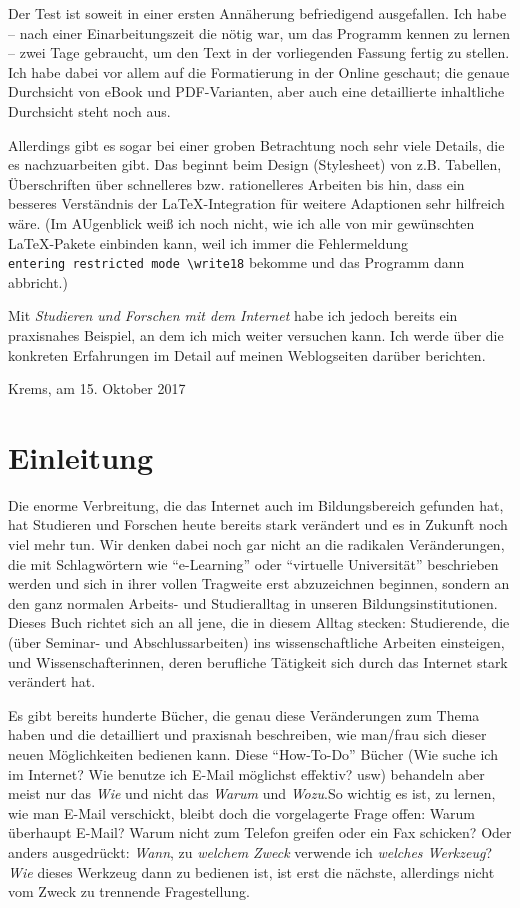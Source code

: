 \documentclass[]{book}
\theoremstyle{definition}
\theoremstyle{definition}
\theoremstyle{definition}
\theoremstyle{remark}
\begin{document}
Der Test ist soweit in einer ersten Annäherung befriedigend ausgefallen.
Ich habe -- nach einer Einarbeitungszeit die nötig war, um das Programm
kennen zu lernen -- zwei Tage gebraucht, um den Text in der vorliegenden
Fassung fertig zu stellen. Ich habe dabei vor allem auf die Formatierung
in der Online geschaut; die genaue Durchsicht von eBook und
PDF-Varianten, aber auch eine detaillierte inhaltliche Durchsicht steht
noch aus.

Allerdings gibt es sogar bei einer groben Betrachtung noch sehr viele
Details, die es nachzuarbeiten gibt. Das beginnt beim Design
(Stylesheet) von z.B. Tabellen, Überschriften über schnelleres bzw.
rationelleres Arbeiten bis hin, dass ein besseres Verständnis der
LaTeX-Integration für weitere Adaptionen sehr hilfreich wäre. (Im
AUgenblick weiß ich noch nicht, wie ich alle von mir gewünschten
LaTeX-Pakete einbinden kann, weil ich immer die Fehlermeldung
\texttt{entering\ restricted\ mode\ \textbackslash{}write18} bekomme und
das Programm dann abbricht.)

Mit \emph{Studieren und Forschen mit dem Internet} habe ich jedoch
bereits ein praxisnahes Beispiel, an dem ich mich weiter versuchen kann.
Ich werde über die konkreten Erfahrungen im Detail auf meinen
Weblogseiten darüber berichten.

Krems, am 15. Oktober 2017

\chapter*{Einleitung}\label{einleitung}

Die enorme Verbreitung, die das Internet auch im Bildungsbereich
gefunden hat, hat Studieren und Forschen heute bereits stark verändert
und es in Zukunft noch viel mehr tun. Wir denken dabei noch gar nicht an
die radikalen Veränderungen, die mit Schlagwörtern wie ``e-Learning''
oder ``virtuelle Universität'' beschrieben werden und sich in ihrer
vollen Tragweite erst abzuzeichnen beginnen, sondern an den ganz
normalen Arbeits- und Studieralltag in unseren Bildungsinstitutionen.
Dieses Buch richtet sich an all jene, die in diesem Alltag stecken:
Studierende, die (über Seminar- und Abschlussarbeiten) ins
wissenschaftliche Arbeiten einsteigen, und Wissenschafterinnen, deren
berufliche Tätigkeit sich durch das Internet stark verändert hat.

Es gibt bereits hunderte Bücher, die genau diese Veränderungen zum Thema
haben und die detailliert und praxisnah beschreiben, wie man/frau sich
dieser neuen Möglichkeiten bedienen kann. Diese ``How-To-Do'' Bücher
(Wie suche ich im Internet? Wie benutze ich E-Mail möglichst effektiv?
usw) behandeln aber meist nur das \emph{Wie} und nicht das \emph{Warum}
und \emph{Wozu}.So wichtig es ist, zu lernen, wie man E-Mail verschickt,
bleibt doch die vorgelagerte Frage offen: Warum überhaupt E-Mail? Warum
nicht zum Telefon greifen oder ein Fax schicken? Oder anders
ausgedrückt: \emph{Wann}, zu \emph{welchem Zweck} verwende ich
\emph{welches Werkzeug}? \emph{Wie} dieses Werkzeug dann zu bedienen
ist, ist erst die nächste, allerdings nicht vom Zweck zu trennende
Fragestellung.
\end{document}
